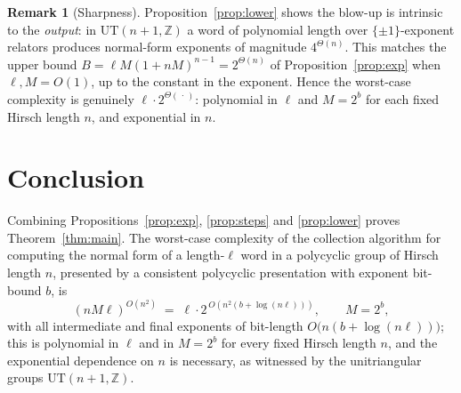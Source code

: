 \documentclass{amsart}
\theoremstyle{definition}
\newtheorem{remark}{Remark}
\begin{document}
\begin{remark}[Sharpness]
Proposition~\ref{prop:lower} shows the blow-up is intrinsic to the \emph{output}: in
$\mathrm{UT}(n+1,\mathbb Z)$ a word of polynomial length over $\{\pm1\}$-exponent relators
produces normal-form exponents of magnitude $4^{\Theta(n)}$. This matches the upper bound
$B=\ell M(1+nM)^{n-1}=2^{\Theta(n)}$ of Proposition~\ref{prop:exp} when $\ell,M=O(1)$, up to
the constant in the exponent. Hence the worst-case complexity is genuinely
$\ell\cdot 2^{\Theta(\,\cdot\,)}$: polynomial in $\ell$ and $M=2^b$ for each fixed Hirsch
length $n$, and exponential in $n$.
\end{remark}

\section{Conclusion}

Combining Propositions~\ref{prop:exp}, \ref{prop:steps} and \ref{prop:lower} proves
Theorem~\ref{thm:main}. The worst-case complexity of the collection algorithm for computing
the normal form of a length-$\ell$ word in a polycyclic group of Hirsch length $n$, presented
by a consistent polycyclic presentation with exponent bit-bound $b$, is
\[
(nM\ell)^{O(n^2)}\;=\;\ell\cdot 2^{\,O(n^2(b+\log(n\ell)))},\qquad M=2^b,
\]
with all intermediate and final exponents of bit-length $O\!\bigl(n(b+\log(n\ell))\bigr)$; this
is polynomial in $\ell$ and in $M=2^b$ for every fixed Hirsch length $n$, and the exponential
dependence on $n$ is necessary, as witnessed by the unitriangular groups
$\mathrm{UT}(n+1,\mathbb Z)$.
\end{document}
